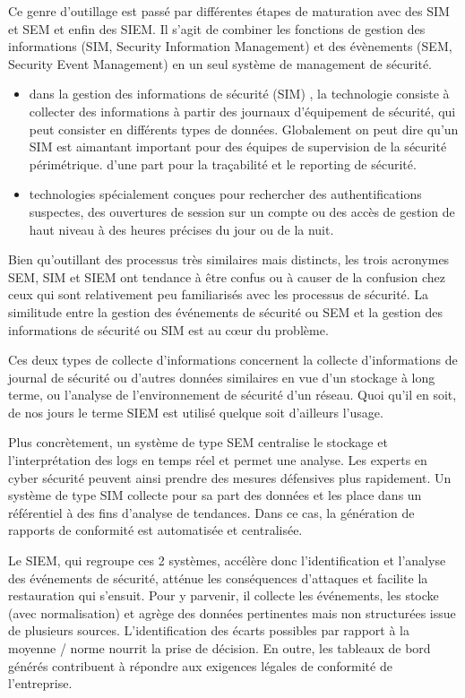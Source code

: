  Ce genre d'outillage est passé par différentes étapes de maturation avec des SIM et SEM  et enfin des SIEM.
Il s’agit de combiner les fonctions de gestion des informations (SIM, Security Information Management) et des évènements  (SEM, Security Event Management) en un seul système de management de sécurité.

\begin{itemize}

	\item dans la gestion des informations de sécurité (SIM) , la technologie consiste  à collecter des informations à partir des journaux d'équipement de sécurité, qui peut consister en différents types de données. Globalement on peut dire qu'un SIM est aimantant important pour des équipes de supervision de la sécurité périmétrique. d'une part pour la traçabilité et le reporting de sécurité.
	\item technologies spécialement conçues pour rechercher des authentifications suspectes, des ouvertures de session sur un compte ou des accès de gestion de haut niveau à des heures précises du jour ou de la nuit.
\end{itemize}

Bien qu'outillant des processus très similaires mais distincts, les trois acronymes SEM, SIM et SIEM ont tendance à être confus ou à causer de la confusion chez ceux qui sont relativement peu familiarisés avec les processus de sécurité.
La similitude entre la gestion des événements de sécurité ou SEM et la gestion des informations de sécurité ou SIM est au cœur du problème.

Ces deux types de collecte d'informations concernent la collecte d'informations de journal de sécurité ou d'autres données similaires en vue d'un stockage à long terme, ou l'analyse de l'environnement de sécurité d'un réseau. Quoi qu'il en soit, de nos jours le terme SIEM est utilisé quelque soit d'ailleurs l'usage.


Plus concrètement, un système de type SEM centralise le stockage et l’interprétation des logs en temps réel et permet une analyse. Les experts en cyber sécurité peuvent ainsi prendre des mesures défensives plus rapidement. Un système de type SIM collecte pour sa part des données et les place dans un référentiel à des fins d’analyse de tendances. Dans ce cas, la génération de rapports de conformité est automatisée et centralisée.

Le SIEM, qui regroupe ces 2 systèmes, accélère donc l’identification et l’analyse des événements de sécurité, atténue les conséquences d’attaques et facilite la restauration qui s’ensuit. Pour y parvenir, il collecte les événements, les stocke (avec normalisation) et agrège des données pertinentes mais non structurées issue de plusieurs sources. L’identification des écarts possibles par rapport à la moyenne / norme nourrit la prise de décision. En outre, les tableaux de bord générés contribuent à répondre aux exigences légales de conformité de l’entreprise.

